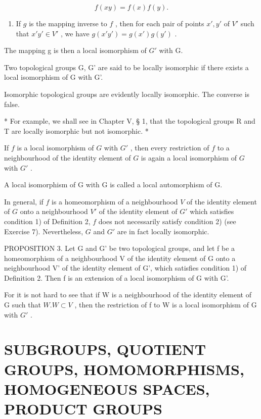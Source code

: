 \[
f (x y) = f (x) f (y).
\]

\begin{enumerate}
\def\labelenumi{\arabic{enumi})}
\setcounter{enumi}{1}
\tightlist
\item
  If \(g\) is the mapping inverse to \(f\) , then for each pair of points \(x', y'\) of \(V'\) such that \(x'y' \in V'\) , we have \(g(x'y') = g(x')g(y')\) .
\end{enumerate}

The mapping g is then a local isomorphism of \(G'\) with G.

Two topological groups G, G' are said to be locally isomorphic if there exists a local isomorphism of G with G'.

Isomorphic topological groups are evidently locally isomorphic. The converse is false.

* For example, we shall see in Chapter V, § 1, that the topological groups R and T are locally isomorphic but not isomorphic. *

If \(f\) is a local isomorphism of \(G\) with \(G'\) , then every restriction of \(f\) to a neighbourhood of the identity element of \(G\) is again a local isomorphism of \(G\) with \(G'\) .

A local isomorphism of G with G is called a local automorphism of G.

In general, if \(f\) is a homeomorphism of a neighbourhood \(V\) of the identity element of \(G\) onto a neighbourhood \(V'\) of the identity element of \(G'\) which satisfies condition 1) of Definition 2, \(f\) does not necessarily satisfy condition 2) (see Exercise 7). Nevertheless, \(G\) and \(G'\) are in fact locally isomorphic.

PROPOSITION 3. Let G and G' be two topological groups, and let f be a homeomorphism of a neighbourhood V of the identity element of G onto a neighbourhood V' of the identity element of G', which satisfies condition 1) of Definition 2. Then f is an extension of a local isomorphism of G with G'.

For it is not hard to see that if W is a neighbourhood of the identity element of G such that \(W.W \subset V\) , then the restriction of f to W is a local isomorphism of G with \(G'\) .

\section{SUBGROUPS, QUOTIENT GROUPS, HOMOMORPHISMS, HOMOGENEOUS SPACES, PRODUCT GROUPS}

